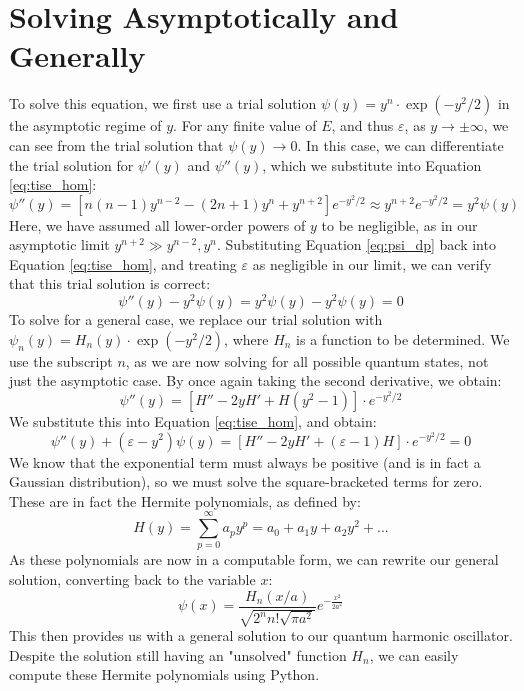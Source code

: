 \documentclass[a4paper]{article}
\begin{document}
\section{Solving Asymptotically and Generally}
To solve this equation, we first use a trial solution $\psi(y)=y^n\cdot\exp(-y^2/2)$ in the asymptotic regime of $y$. For any finite value of $E$, and thus $\varepsilon$, as $y\rightarrow\pm\infty$, we can see from the trial solution that $\psi(y)\rightarrow 0$. In this case, we can differentiate the trial solution for $\psi'(y)$ and $\psi''(y)$, which we substitute into Equation \ref{eq:tise_hom}:
\begin{equation} \label{eq:psi_dp}
\psi''(y)=[n(n-1)y^{n-2}-(2n+1)y^n+y^{n+2}]e^{-y^2/2}\approx y^{n+2}e^{-y^2/2}=y^2\psi(y)
\end{equation}
Here, we have assumed all lower-order powers of $y$ to be negligible, as in our asymptotic limit $y^{n+2}\gg y^{n-2}, y^n$. Substituting Equation \ref{eq:psi_dp} back into Equation \ref{eq:tise_hom}, and treating $\varepsilon$ as negligible in our limit, we can verify that this trial solution is correct:
\begin{equation} \label{eq:limit_verify}
\psi''(y)-y^2\psi(y)=y^2\psi(y)-y^2\psi(y)=0
\end{equation}
To solve for a general case, we replace our trial solution with $\psi_n(y)=H_n(y)\cdot\exp(-y^2/2)$, where $H_n$ is a function to be determined. We use the subscript $n$, as we are now solving for all possible quantum states, not just the asymptotic case. By once again taking the second derivative, we obtain:
\begin{equation}
\psi''(y)=[H''-2yH'+H(y^2-1)]\cdot e^{-y^2/2}
\end{equation}
We substitute this into Equation \ref{eq:tise_hom}, and obtain:
\begin{equation}
\psi''(y)+(\varepsilon-y^2)\psi(y)=[H''-2yH'+(\varepsilon-1)H]\cdot e^{-y^2/2}=0
\end{equation}
We know that the exponential term must always be positive (and is in fact a Gaussian distribution), so we must solve the square-bracketed terms for zero. These are in fact the Hermite polynomials, as defined by:
\begin{equation}
H(y)=\sum^\infty_{p=0}a_py^p=a_0+a_1y+a_2y^2+...
\end{equation}
As these polynomials are now in a computable form, we can rewrite our general solution, converting back to the variable $x$:
\begin{equation}
\psi(x)=\frac{H_n(x/a)}{\sqrt{2^nn!\sqrt{\pi a^2}}}e^{-\frac{x^2}{2a^2}}
\end{equation}
This then provides us with a general solution to our quantum harmonic oscillator. Despite the solution still having an "unsolved" function $H_n$, we can easily compute these Hermite polynomials using Python.
\end{document}
